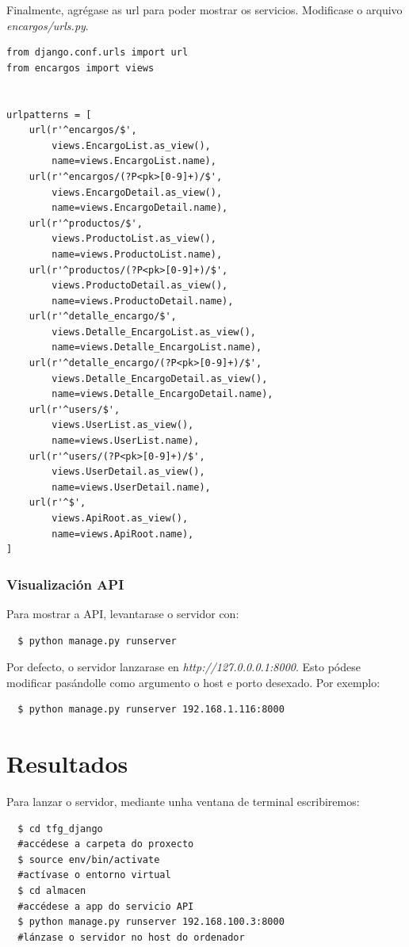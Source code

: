 \documentclass[11pt,twoside]{book}
\begin{document}
Finalmente, agrégase as url para poder mostrar os servicios. Modificase o arquivo \textit{encargos/urls.py}.
\begin{verbatim}
from django.conf.urls import url
from encargos import views


urlpatterns = [
    url(r'^encargos/$', 
        views.EncargoList.as_view(),
        name=views.EncargoList.name),
    url(r'^encargos/(?P<pk>[0-9]+)/$', 
        views.EncargoDetail.as_view(),
        name=views.EncargoDetail.name),
    url(r'^productos/$', 
        views.ProductoList.as_view(),
        name=views.ProductoList.name),
    url(r'^productos/(?P<pk>[0-9]+)/$', 
        views.ProductoDetail.as_view(),
        name=views.ProductoDetail.name),
    url(r'^detalle_encargo/$', 
        views.Detalle_EncargoList.as_view(),
        name=views.Detalle_EncargoList.name),
    url(r'^detalle_encargo/(?P<pk>[0-9]+)/$', 
        views.Detalle_EncargoDetail.as_view(),
        name=views.Detalle_EncargoDetail.name),
    url(r'^users/$',
        views.UserList.as_view(),
        name=views.UserList.name),
    url(r'^users/(?P<pk>[0-9]+)/$',
        views.UserDetail.as_view(),
        name=views.UserDetail.name),
    url(r'^$',
        views.ApiRoot.as_view(),
        name=views.ApiRoot.name),
]
\end{verbatim}

\subsection{Visualización API}

Para mostrar a API, levantarase o servidor con:

\begin{verbatim}
  $ python manage.py runserver 
\end{verbatim}

Por defecto, o servidor lanzarase en \textit{http://127.0.0.0.1:8000}. Esto pódese modificar pasándolle como argumento o host e porto desexado. Por exemplo:

\begin{verbatim}
  $ python manage.py runserver 192.168.1.116:8000
\end{verbatim}

\chapter{Resultados}

Para lanzar o servidor, mediante unha ventana de terminal escribiremos:
\begin{verbatim}
  $ cd tfg_django                                 
  #accédese a carpeta do proxecto
  $ source env/bin/activate                       
  #actívase o entorno virtual
  $ cd almacen                                    
  #accédese a app do servicio API
  $ python manage.py runserver 192.168.100.3:8000 
  #lánzase o servidor no host do ordenador
\end{verbatim}
\end{document}
